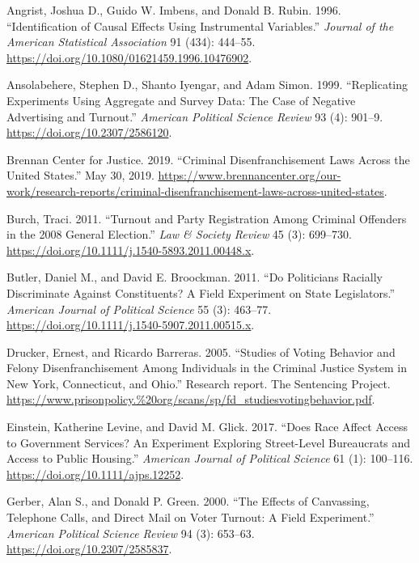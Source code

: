 \documentclass[
  12pt,
]{article}
\newlength{\cslhangindent}
\newenvironment{cslreferences}%
  {\setlength{\parindent}{0pt}%
  \everypar{\setlength{\hangindent}{\cslhangindent}}\ignorespaces}%
  {\par}
\begin{document}
\hypertarget{refs}{}
\begin{cslreferences}
\leavevmode\hypertarget{ref-Angrist1996}{}%
Angrist, Joshua D., Guido W. Imbens, and Donald B. Rubin. 1996. ``Identification of Causal Effects Using Instrumental Variables.'' \emph{Journal of the American Statistical Association} 91 (434): 444--55. \url{https://doi.org/10.1080/01621459.1996.10476902}.

\leavevmode\hypertarget{ref-Ansolabehere1999}{}%
Ansolabehere, Stephen D., Shanto Iyengar, and Adam Simon. 1999. ``Replicating Experiments Using Aggregate and Survey Data: The Case of Negative Advertising and Turnout.'' \emph{American Political Science Review} 93 (4): 901--9. \url{https://doi.org/10.2307/2586120}.

\leavevmode\hypertarget{ref-bcj_laws}{}%
Brennan Center for Justice. 2019. ``Criminal Disenfranchisement Laws Across the United States.'' May 30, 2019. \url{https://www.brennancenter.org/our-work/research-reports/criminal-disenfranchisement-laws-across-united-states}.

\leavevmode\hypertarget{ref-Burch2011}{}%
Burch, Traci. 2011. ``Turnout and Party Registration Among Criminal Offenders in the 2008 General Election.'' \emph{Law \& Society Review} 45 (3): 699--730. \url{https://doi.org/10.1111/j.1540-5893.2011.00448.x}.

\leavevmode\hypertarget{ref-Butler2011}{}%
Butler, Daniel M., and David E. Broockman. 2011. ``Do Politicians Racially Discriminate Against Constituents? A Field Experiment on State Legislators.'' \emph{American Journal of Political Science} 55 (3): 463--77. \url{https://doi.org/10.1111/j.1540-5907.2011.00515.x}.

\leavevmode\hypertarget{ref-Drucker2005}{}%
Drucker, Ernest, and Ricardo Barreras. 2005. ``Studies of Voting Behavior and Felony Disenfranchisement Among Individuals in the Criminal Justice System in New York, Connecticut, and Ohio.'' Research report. The Sentencing Project. \url{https://www.prisonpolicy.\%20org/scans/sp/fd_studiesvotingbehavior.pdf}.

\leavevmode\hypertarget{ref-Einstein2017}{}%
Einstein, Katherine Levine, and David M. Glick. 2017. ``Does Race Affect Access to Government Services? An Experiment Exploring Street-Level Bureaucrats and Access to Public Housing.'' \emph{American Journal of Political Science} 61 (1): 100--116. \url{https://doi.org/10.1111/ajps.12252}.

\leavevmode\hypertarget{ref-Gerber2000}{}%
Gerber, Alan S., and Donald P. Green. 2000. ``The Effects of Canvassing, Telephone Calls, and Direct Mail on Voter Turnout: A Field Experiment.'' \emph{American Political Science Review} 94 (3): 653--63. \url{https://doi.org/10.2307/2585837}.


\end{cslreferences}
\end{document}
